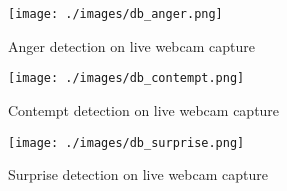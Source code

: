 \begin{figure}
  \centering
  \texttt{[image: ./images/db\_anger.png]}
  \caption{Anger detection on live webcam capture}
  \label{fig:exampl_anger}
\end{figure}

\begin{figure}
  \centering
  \texttt{[image: ./images/db\_contempt.png]}
  \caption{Contempt detection on live webcam capture}
  \label{fig:exampl_contempt}
\end{figure}

\begin{figure}
  \centering
  \texttt{[image: ./images/db\_surprise.png]}
  \caption{Surprise detection on live webcam capture}
  \label{fig:exampl_surprise}
\end{figure}
\newpage
